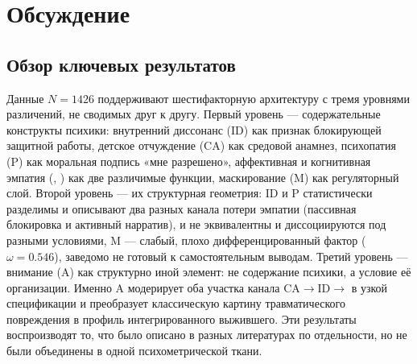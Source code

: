 \section{Обсуждение}
\label{sec:discussion}

\subsection{Обзор ключевых результатов}

Данные $N = 1426$ поддерживают шестифакторную архитектуру с тремя уровнями различений, не сводимых друг к другу. Первый уровень --- содержательные конструкты психики: внутренний диссонанс (ID) как признак блокирующей защитной работы, детское отчуждение (CA) как средовой анамнез, психопатия (P) как моральная подпись «мне разрешено», аффективная и когнитивная эмпатия (\EAF{}, \Ecog{}) как две различимые функции, маскирование (M) как регуляторный слой. Второй уровень --- их структурная геометрия: ID и P статистически разделимы и описывают два разных канала потери эмпатии (пассивная блокировка и активный нарратив), \Ecog{} и \EAF{} не эквивалентны и диссоциируются под разными условиями, M --- слабый, плохо дифференцированный фактор ($\omega = 0.546$), заведомо не готовый к самостоятельным выводам. Третий уровень --- внимание (A) как структурно иной элемент: не содержание психики, а условие её организации. Именно A модерирует оба участка канала CA$\to$ID$\to$\EAF{} в узкой спецификации и преобразует классическую картину травматического повреждения в профиль интегрированного выжившего. Эти результаты воспроизводят то, что было описано в разных литературах по отдельности, но не были объединены в одной психометрической ткани.

